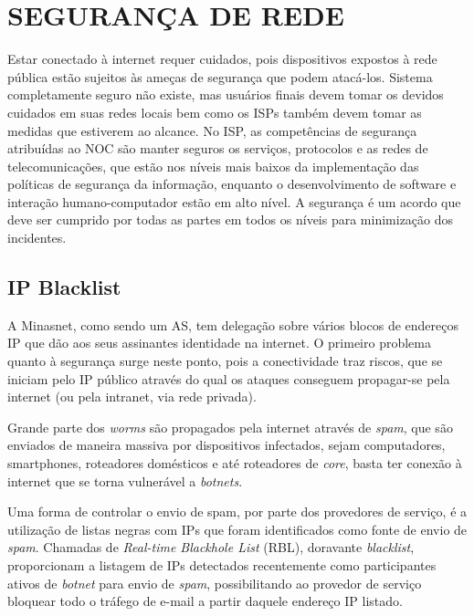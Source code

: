 \chapter{SEGURANÇA DE REDE}
\label{cap:seguranca}

    Estar conectado à internet requer cuidados, pois dispositivos expostos à rede pública estão sujeitos às ameças de segurança que podem atacá-los. Sistema completamente seguro não existe, mas usuários finais devem tomar os devidos cuidados em suas redes locais bem como os ISPs também devem tomar as medidas que estiverem ao alcance. No ISP, as competências de segurança atribuídas ao NOC são manter seguros os serviços, protocolos e as redes de telecomunicações, que estão nos níveis mais baixos da implementação das políticas de segurança da informação, enquanto o desenvolvimento de software e interação humano-computador estão em alto nível. A segurança é um acordo que deve ser cumprido por todas as partes em todos os níveis para minimização dos incidentes.

\section{IP Blacklist}

    A Minasnet, como sendo um AS, tem delegação sobre vários blocos de endereços IP que dão aos seus assinantes identidade na internet. O primeiro problema quanto à segurança surge neste ponto, pois a conectividade traz riscos, que se iniciam pelo IP público através do qual os ataques conseguem propagar-se pela internet (ou pela intranet, via rede privada).
    
    Grande parte dos \textit{worms} são propagados pela internet através de \textit{spam}, que são enviados de maneira massiva por dispositivos infectados, sejam computadores, smartphones, roteadores domésticos e até roteadores de \textit{core}, basta ter conexão à internet que se torna vulnerável a \textit{botnets}. 
    
    Uma forma de controlar o envio de spam, por parte dos provedores de serviço, é a utilização de listas negras com IPs que foram identificados como fonte de envio de \textit{spam}. Chamadas de \textit{Real-time Blackhole List} (RBL), doravante \textit{blacklist}, proporcionam a listagem de IPs detectados recentemente como participantes ativos de \textit{botnet} para envio de \textit{spam}, possibilitando ao provedor de serviço bloquear todo o tráfego de e-mail a partir daquele endereço IP listado. 
    
